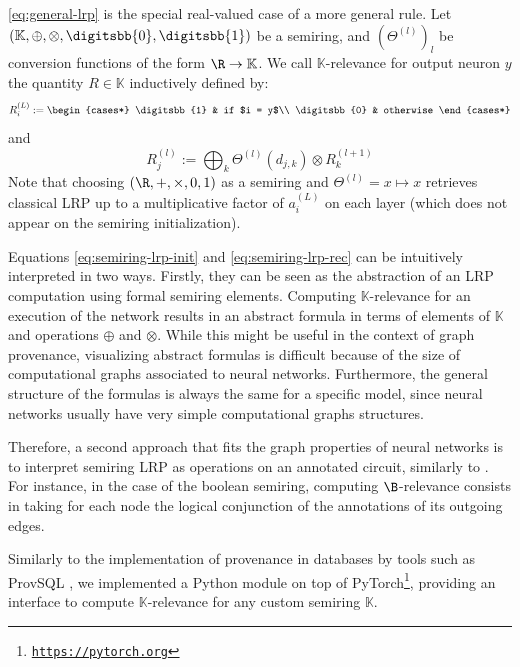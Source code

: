 \documentclass{../cs-classes/cs-classes}
\newcommand*{\K}{\mathbb{K}}
\newcommand*{\1}{\digitsbb{1}}
\newcommand*{\0}{\digitsbb{0}}
\begin{document}
\autoref{eq:general-lrp} is the special real-valued case of a more general rule. Let $(\K, \oplus, \otimes, \0, \1)$ be a semiring, and $(\Theta^{(l)})_l$ be conversion functions of the form $\R\to\K$. We call $\K$-relevance for output neuron $y$ the quantity $R\in\K$ inductively defined by:
\begin{equation}
    R^{(L)}_i := \begin{cases*}
        \1 & if $i = y$\\
        \0 & otherwise
    \end{cases*}
    \label{eq:semiring-lrp-init}
\end{equation}
and
\begin{equation}
    R^{(l)}_j := \bigoplus_{k}\Theta^{(l)}(d_{j,k}) \otimes R^{(l+1)}_k
    \label{eq:semiring-lrp-rec}
\end{equation}
Note that choosing $(\R,+,\times,0,1)$ as a semiring and $\Theta^{(l)}=x\mapsto x$ retrieves classical LRP up to a multiplicative factor of $a_i^{(L)}$ on each layer (which does not appear on the semiring initialization).

Equations \ref{eq:semiring-lrp-init} and \ref{eq:semiring-lrp-rec} can be intuitively interpreted in two ways. Firstly, they can be seen as the abstraction of an LRP computation using formal semiring elements. Computing $\K$-relevance for an execution of the network results in an abstract formula in terms of elements of $\K$ and operations $\oplus$ and $\otimes$. While this might be useful in the context of graph provenance, visualizing abstract formulas is difficult because of the size of computational graphs associated to neural networks. Furthermore, the general structure of the formulas is always the same for a specific model, since neural networks usually have very simple computational graphs structures. 

Therefore, a second approach that fits the graph properties of neural networks is to interpret semiring LRP as operations on an annotated circuit, similarly to \cite{senellart2018provenance}. For instance, in the case of the boolean semiring, computing $\B$-relevance consists in taking for each node the logical conjunction of the annotations of its outgoing edges.

Similarly to the implementation of provenance in databases by tools such as ProvSQL \cite{provsql}, we implemented a Python module on top of PyTorch\footnote{\href{https://pytorch.org}{\texttt{https://pytorch.org}}}, providing an interface to compute $\K$-relevance for any custom semiring $\K$.
\end{document}
